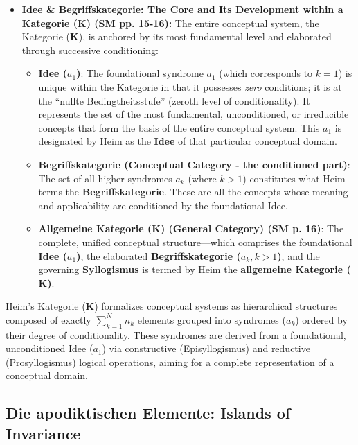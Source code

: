 \documentclass[12pt]{article}
\newcommand{\q}[1]{\enquote{#1}}
\newcommand{\kategorie}{\bm{K}}
\newcommand{\conceptualsyndrome}{a}
\begin{document}
\begin{itemize}
    \item \textbf{Idee \& Begriffskategorie: The Core and Its Development within a Kategorie (\(\kategorie\)) (SM pp. 15-16):}
    The entire conceptual system, the Kategorie (\(\kategorie\)), is anchored by its most fundamental level and elaborated through successive conditioning:
    \begin{itemize}
        \item \textbf{Idee (\( \conceptualsyndrome_1 \))}: The foundational syndrome \( \conceptualsyndrome_1 \) (which corresponds to \( k=1 \)) is unique within the Kategorie in that it possesses \textit{zero} conditions; it is at the \q{nullte Bedingtheitsstufe} (zeroth level of conditionality). It represents the set of the most fundamental, unconditioned, or irreducible concepts that form the basis of the entire conceptual system. This \( \conceptualsyndrome_1 \) is designated by Heim as the \textbf{Idee} of that particular conceptual domain.
        \item \textbf{Begriffskategorie (Conceptual Category - the conditioned part)}: The set of all higher syndromes \( \conceptualsyndrome_k \) (where \( k > 1 \)) constitutes what Heim terms the \textbf{Begriffskategorie}. These are all the concepts whose meaning and applicability are conditioned by the foundational Idee.
        \item \textbf{Allgemeine Kategorie (\(\kategorie\)) (General Category) (SM p. 16)}: The complete, unified conceptual structure—which comprises the foundational \textbf{Idee (\( \conceptualsyndrome_1 \))}, the elaborated \textbf{Begriffskategorie (\( \conceptualsyndrome_k, k>1 \))}, and the governing \textbf{Syllogismus} is termed by Heim the \textbf{allgemeine Kategorie (\(\kategorie\))}. 
    \end{itemize}
\end{itemize}

Heim's Kategorie (\(\kategorie\)) formalizes conceptual systems as hierarchical structures composed of exactly $\sum_{k=1}^N n_k$ elements grouped into syndromes (\(\conceptualsyndrome_k\)) ordered by their degree of conditionality. These syndromes are derived from a foundational, unconditioned Idee (\(\conceptualsyndrome_1\)) via constructive (Episyllogismus) and reductive (Prosyllogismus) logical operations, aiming for a complete representation of a conceptual domain.

\subsection{Die apodiktischen Elemente: Islands of Invariance}
\label{sec:apodiktik}
\end{document}
